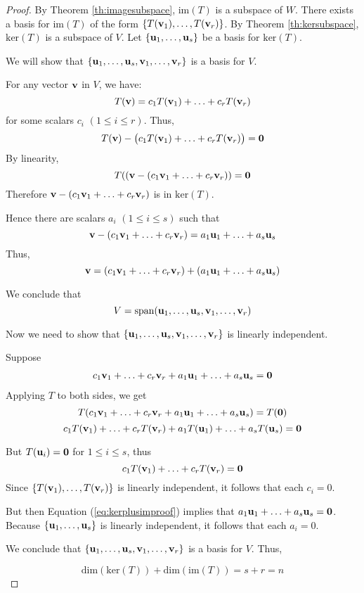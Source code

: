 \documentclass{ximera}
\renewcommand{\vec}[1]{{\bf #1}}
\begin{document}
\begin{proof}
By Theorem \ref{th:imagesubspace}, $\text{im}(T)$ is a subspace of $W$.  There exists a basis for $\text{im}(T)$ of the form $\{T(\vec{v}_1), \ldots,T(\vec{v}_r)\}$.  By Theorem \ref{th:kersubspace}, $\text{ker}(T)$ is a subspace of $V$.  Let $\{\vec{u}_1,\ldots,\vec{u}_s\}$ be a basis for $\text{ker}(T)$. 

We will show that $\{\vec{u}_1,\ldots ,\vec{u}_s, \vec{v}_1,\ldots ,\vec{v}_r\}$ is a basis for $V$.

For any vector $\vec{v}$ in $V$, we have:
$$T(\vec{v})=c_1T(\vec{v}_1)+\ldots +c_rT(\vec{v}_r)$$
for some scalars $c_i$ $(1\leq i\leq r)$.
Thus, 
$$T(\vec{v})-\big(c_1T(\vec{v}_1)+\ldots +c_rT(\vec{v}_r)\big)=\vec{0}$$
By linearity,
$$T((\vec{v}-(c_1\vec{v}_1+\ldots +c_r\vec{v}_r))=\vec{0}$$
Therefore $\vec{v}-(c_1\vec{v}_1+\ldots +c_r\vec{v}_r)$ is in $\text{ker}(T)$.

Hence there are scalars $a_i$ $(1\leq i\leq s)$ such that
$$\vec{v}-(c_1\vec{v}_1+\ldots +c_r\vec{v}_r)=a_1\vec{u}_1+\ldots +a_s\vec{u}_s$$
Thus,
$$\vec{v}=(c_1\vec{v}_1+\ldots +c_r\vec{v}_r)+(a_1\vec{u}_1+\ldots +a_s\vec{u}_s)$$

We conclude that 
$$V=\text{span}(\vec{u}_1,\ldots ,\vec{u}_s, \vec{v}_1,\ldots ,\vec{v}_r)$$

Now we need to show that $\{\vec{u}_1,\ldots ,\vec{u}_s, \vec{v}_1,\ldots ,\vec{v}_r\}$ is linearly independent.

Suppose 
\begin{align}\label{eq:kerplusimproof} c_1\vec{v}_1+\ldots +c_r\vec{v}_r+a_1\vec{u}_1+\ldots +a_s\vec{u}_s=\vec{0}\end{align}
Applying $T$ to both sides, we get
$$T(c_1\vec{v}_1+\ldots +c_r\vec{v}_r+a_1\vec{u}_1+\ldots +a_s\vec{u}_s)=T(\vec{0})$$
$$c_1T(\vec{v}_1)+\ldots +c_rT(\vec{v}_r)+a_1T(\vec{u}_1)+\ldots +a_sT(\vec{u}_s)=\vec{0}$$

But $T(\vec{u}_i)=\vec{0}$ for $1\leq i\leq s$, thus
$$c_1T(\vec{v}_1)+\ldots +c_rT(\vec{v}_r)=\vec{0}$$
Since $\{T(\vec{v}_1),\ldots ,T(\vec{v}_r)\}$ is linearly independent, it follows that each $c_i=0$.  

But then Equation (\ref{eq:kerplusimproof}) implies that $a_1\vec{u}_1+\ldots +a_s\vec{u}_s=\vec{0}$.  Because $\{\vec{u}_1, \ldots ,\vec{u}_s\}$ is linearly independent, it follows that each $a_i=0$.  

We conclude that $\{\vec{u}_1,\ldots ,\vec{u}_s,\vec{v}_1,\ldots ,\vec{v}_r\}$ is a basis for $V$.  Thus,

$$\text{dim}(\text{ker}(T))+\text{dim}(\text{im}(T))=s+r=n$$
\end{proof}
\end{document}
